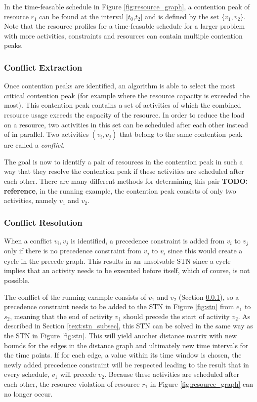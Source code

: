 \documentclass{article}
\theoremstyle{definition}
\newcommand{\TODO}[1]{{\color{red}\textbf{TODO: #1}}}
\begin{document}
In the time-feasable schedule in Figure \ref{fig:resource_graph}, a contention peak of resource $r_1$ can be found at the interval [$t_0$,$t_2$] and is defined by the set $\{v_1,v_2\}$. Note that the resource profiles for a time-feasable schedule for a larger problem with more activities, constraints and resources can contain multiple contention peaks.

\subsubsection{Conflict Extraction}
\label{text:conflict}
Once contention peaks are identified, an algorithm is able to select the most critical contention peak (for example where the resource capacity is exceeded the most). This contention peak contains a set of activities of which the combined resource usage exceeds the capacity of the resource. In order to reduce the load on a resource, two activities in this set can be scheduled after each other instead of in parallel. Two activities $(v_i,v_j)$ that belong to the same contention peak are called a \emph{conflict}.

The goal is now to identify a pair of resources in the contention peak in such a way that they resolve the contention peak if these activities are scheduled after each other. There are many different methods for determining this pair \TODO{reference}, in the running example, the contention peak consists of only two activities, namely $v_1$ and $v_2$.

\subsubsection{Conflict Resolution}
When a conflict ${v_i, v_j}$ is identified, a precedence constraint is added from $v_i$ to $v_j$ only if there is no precedence constraint from $v_j$ to $v_i$ since this would create a cycle in the precede graph. This results in an unsolvable STN since a cycle implies that an activity needs to be executed before itself, which of course, is not possible.

The conflict of the running example consists of $v_1$ and $v_2$ (Section \ref{text:conflict}), so a precedence constraint needs to be added to the STN in Figure \ref{fig:stn} from $e_1$ to $s_2$, meaning that the end of activity $v_1$ should precede the start of activity $v_2$. As described in Section \ref{text:stn_subsec}, this STN can be solved in the same way as the STN in Figure \ref{fig:stn}. This will yield another distance matrix with new bounds for the edges in the distance graph and ultimately new time intervals for the time points. If for each edge, a value within its time window is chosen, the newly added precedence constraint will be respected leading to the result that in every schedule, $v_1$ will precede $v_2$. Because these activities are scheduled after each other, the resource violation of resource $r_1$ in Figure \ref{fig:resource_graph} can no longer occur.
\end{document}
